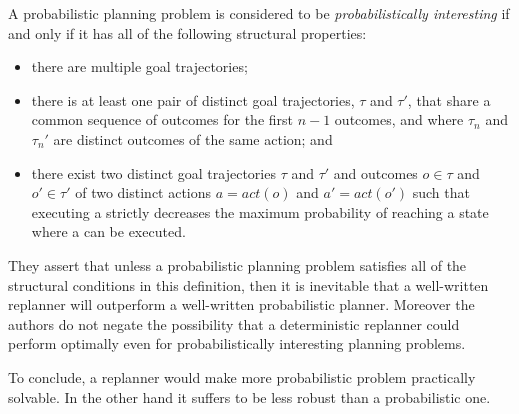 \begin{displayquote}
A probabilistic planning problem is considered to be \textit{probabilistically interesting} if and only if it has all of the following structural properties:
\begin{itemize}
\item there are multiple goal trajectories;
\item there is at least one pair of distinct goal trajectories, $\tau$
and $\tau'$, that share a common sequence of outcomes for the
first $n-1$ outcomes, and where $\tau_n$ and $\tau_n'$ are distinct
outcomes of the same action; and
\item there exist two distinct goal trajectories $\tau$ and $\tau'$ and outcomes $o \in \tau$ and $o' \in \tau'$ of two distinct actions $a = act(o)$ and $a' = act(o')$  such that executing a strictly decreases
the maximum probability of reaching a state where a can
be executed.
\end{itemize}
\end{displayquote}
They assert that unless a probabilistic planning problem satisfies all of the structural conditions in this definition, then
it is inevitable that a well-written replanner will outperform
a well-written probabilistic planner. Moreover the authors do not negate the possibility that a deterministic replanner could perform optimally even for probabilistically interesting planning problems. 

To conclude, a replanner would make more probabilistic problem practically solvable. In the other hand it suffers to be less robust than a probabilistic one. 

